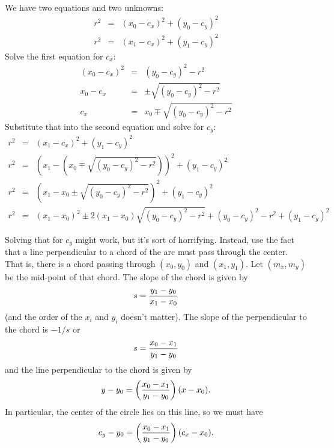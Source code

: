 \documentclass[titlepage,oneside,10pt]{article}
\begin{document}
We have two equations and two unknowns:
\begin{eqnarray*}
  r^2 &=& (x_0-c_x)^2 + (y_0-c_y)^2 \\
  r^2 &=& (x_1-c_x)^2 + (y_1-c_y)^2
\end{eqnarray*}
Solve the first equation for $c_x$:
\begin{eqnarray*}
  (x_0-c_x)^2 &=& (y_0-c_y)^2 - r^2\\
  x_0-c_x &=& \pm\sqrt{(y_0-c_y)^2 - r^2}\\
  c_x &=& x_0 \mp\sqrt{(y_0-c_y)^2 - r^2}
\end{eqnarray*}
Substitute that into the second equation and solve for $c_y$:
\begin{eqnarray*}
  r^2 &=& (x_1-c_x)^2 + (y_1-c_y)^2 \\
  r^2 &=& \left(x_1-\left(x_0 \mp\sqrt{(y_0-c_y)^2 - r^2}\right)\right)^2 + (y_1-c_y)^2 \\
  r^2 &=& \left(x_1-x_0 \pm\sqrt{(y_0-c_y)^2 - r^2}\right)^2 + (y_1-c_y)^2 \\
  r^2 &=& (x_1-x_0)^2 \pm 2(x_1-x_0)\sqrt{(y_0-c_y)^2 - r^2} +
  (y_0-c_y)^2 - r^2 + (y_1-c_y)^2 
\end{eqnarray*}

Solving that for $c_y$ might work, but it's sort of
horrifying. Instead, use the fact that a line perpendicular to a chord
of the arc must pass through the center. That is, there is a chord
passing through $(x_0,y_0)$ and $(x_1,y_1)$. Let $(m_x,m_y)$ be the
mid-point of that chord. The slope of the chord is given by
$$s = {y_1-y_0\over x_1-x_0}$$
(and the order of the $x_i$ and $y_i$ doesn't matter). The slope of
the perpendicular to the chord is $-1/s$ or
$$s = {x_0-x_1\over y_1-y_0}$$
and the line perpendicular to the chord is given by
$$y - y_0 = \left({x_0-x_1\over y_1-y_0}\right) (x-x_0).$$
In particular, the center of the circle lies on this line, so we must
have
$$c_y - y_0 = \left({x_0-x_1\over y_1-y_0}\right) (c_x-x_0).$$
\end{document}

